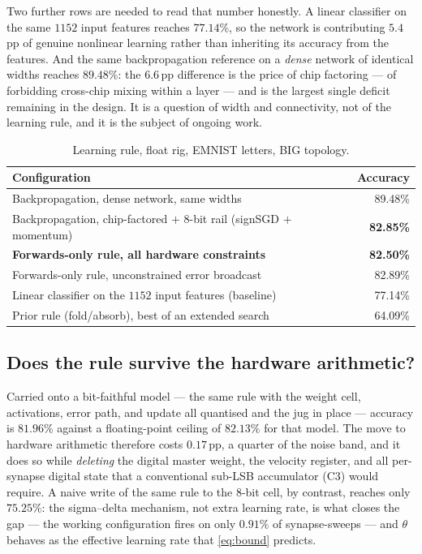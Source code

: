 \documentclass[11pt]{article}
\begin{document}
Two further rows are needed to read that number honestly. A linear classifier on the same $1152$
input features reaches $77.14\%$, so the network is contributing $5.4$\,pp of genuine nonlinear
learning rather than inheriting its accuracy from the features. And the same backpropagation
reference on a \emph{dense} network of identical widths reaches $89.48\%$: the $6.6$\,pp difference is
the price of chip factoring --- of forbidding cross-chip mixing within a layer --- and is the largest
single deficit remaining in the design. It is a question of width and connectivity, not of the
learning rule, and it is the subject of ongoing work.

\begin{table}[t]
\centering\small
\caption{Learning rule, float rig, EMNIST letters, BIG topology.}
\label{tab:algo}
\begin{tabular}{@{}lr@{}}
\toprule
Configuration & Accuracy \\
\midrule
Backpropagation, dense network, same widths & 89.48\% \\
\midrule
Backpropagation, chip-factored $+$ 8-bit rail (signSGD $+$ momentum) & \textbf{82.85\%} \\
\textbf{Forwards-only rule, all hardware constraints} & \textbf{82.50\%} \\
Forwards-only rule, unconstrained error broadcast & 82.89\% \\
\midrule
Linear classifier on the $1152$ input features (baseline) & 77.14\% \\
Prior rule (fold/absorb), best of an extended search & 64.09\% \\
\bottomrule
\end{tabular}
\end{table}

\subsection{Does the rule survive the hardware arithmetic?}

Carried onto a bit-faithful model --- the same rule with the weight cell, activations, error path, and
update all quantised and the jug in place --- accuracy is $81.96\%$ against a floating-point ceiling of
$82.13\%$ for that model. The move to hardware arithmetic therefore costs $0.17$\,pp, a quarter of the
noise band, and it does so while \emph{deleting} the digital master weight, the velocity register, and
all per-synapse digital state that a conventional sub-LSB accumulator (C3) would require. A naive write
of the same rule to the 8-bit cell, by contrast, reaches only $75.25\%$: the sigma--delta mechanism,
not extra learning rate, is what closes the gap --- the working configuration fires on only $0.91\%$
of synapse-sweeps --- and $\theta$ behaves as the effective learning rate that \eqref{eq:bound}
predicts.
\end{document}

